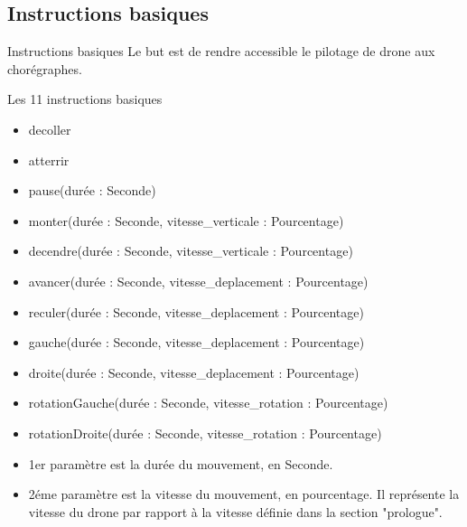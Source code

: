 \documentclass{bredelebeamer}
\begin{document}
	\subsection{Instructions basiques} 
\begin{frame}{Instructions basiques} 
Le but est de rendre accessible le pilotage de drone aux chorégraphes. 
\begin{block}{Les 11 instructions basiques}
\begin{itemize}
\item \alert{decoller}
\item \alert{atterrir}
\item \alert{pause(durée : Seconde)}
\item \alert{monter(durée : Seconde, vitesse\_verticale : Pourcentage)}
\item \alert{decendre(durée : Seconde, vitesse\_verticale : Pourcentage)}
\item \alert{avancer(durée : Seconde, vitesse\_deplacement : Pourcentage)}
\item \alert{reculer(durée : Seconde, vitesse\_deplacement : Pourcentage)}
\item \alert{gauche(durée : Seconde, vitesse\_deplacement : Pourcentage)}
\item \alert{droite(durée : Seconde, vitesse\_deplacement : Pourcentage)}
\item \alert{rotationGauche(durée : Seconde, vitesse\_rotation : Pourcentage)}
\item \alert{rotationDroite(durée : Seconde, vitesse\_rotation : Pourcentage)}
\end{itemize}
\end{block}
\begin{itemize}
\item 1er paramètre est la durée du mouvement, en Seconde.
\item 2éme paramètre est la vitesse du mouvement, en pourcentage. Il représente la vitesse du drone par rapport à la vitesse définie dans la section "prologue".
\end{itemize}
\end{frame}
\end{document}
